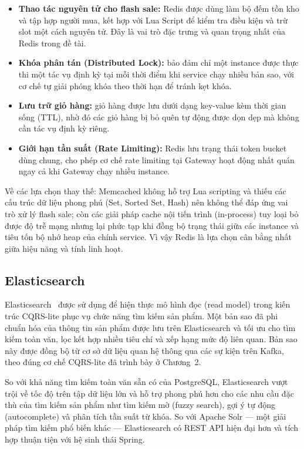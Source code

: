 \documentclass[../DoAn.tex]{subfiles}
\begin{document}
\begin{itemize}[noitemsep]
    \item \textbf{Thao tác nguyên tử cho flash sale:} Redis được dùng làm bộ đếm tồn kho và
          tập hợp người mua, kết hợp với Lua Script để kiểm tra điều kiện và trừ slot một
          cách nguyên tử. Đây là vai trò đặc trưng và quan trọng nhất của Redis trong đề tài.
    \item \textbf{Khóa phân tán (Distributed Lock):} bảo đảm chỉ một instance được thực thi
          một tác vụ định kỳ tại mỗi thời điểm khi service chạy nhiều bản sao, với cơ chế tự
          giải phóng khóa theo thời hạn để tránh kẹt khóa.
    \item \textbf{Lưu trữ giỏ hàng:} giỏ hàng được lưu dưới dạng key-value kèm thời gian sống
          (TTL), nhờ đó các giỏ hàng bị bỏ quên tự động được dọn dẹp mà không cần tác vụ định
          kỳ riêng.
    \item \textbf{Giới hạn tần suất (Rate Limiting):} Redis lưu trạng thái token bucket dùng
          chung, cho phép cơ chế rate limiting tại Gateway hoạt động nhất quán ngay cả khi
          Gateway chạy nhiều instance.
\end{itemize}

Về các lựa chọn thay thế: Memcached không hỗ trợ Lua scripting và thiếu các cấu trúc dữ liệu
phong phú (Set, Sorted Set, Hash) nên không thể đáp ứng vai trò xử lý flash sale; còn các giải
pháp cache nội tiến trình (in-process) tuy loại bỏ được độ trễ mạng nhưng lại phức tạp khi
đồng bộ trạng thái giữa các instance và tiêu tốn bộ nhớ heap của chính service. Vì vậy Redis
là lựa chọn cân bằng nhất giữa hiệu năng và tính linh hoạt.

\subsection{Elasticsearch}

Elasticsearch~\cite{elasticsearch_docs} được sử dụng để hiện thực mô hình đọc (read model)
trong kiến trúc CQRS-lite phục vụ chức năng tìm kiếm sản phẩm. Một bản sao đã phi chuẩn hóa
của thông tin sản phẩm được lưu trên Elasticsearch và tối ưu cho tìm kiếm toàn văn, lọc kết
hợp nhiều tiêu chí và xếp hạng mức độ liên quan. Bản sao này được đồng bộ từ cơ sở dữ liệu
quan hệ thông qua các sự kiện trên Kafka, theo đúng cơ chế CQRS-lite đã trình bày ở Chương~2.

So với khả năng tìm kiếm toàn văn sẵn có của PostgreSQL, Elasticsearch vượt trội về tốc độ
trên tập dữ liệu lớn và hỗ trợ phong phú hơn cho các nhu cầu đặc thù của tìm kiếm sản phẩm
như tìm kiếm mờ (fuzzy search), gợi ý tự động (autocomplete) và phân tích tần suất từ khóa.
So với Apache Solr --- một giải pháp tìm kiếm phổ biến khác --- Elasticsearch có REST API
hiện đại hơn và tích hợp thuận tiện với hệ sinh thái Spring.
\end{document}
